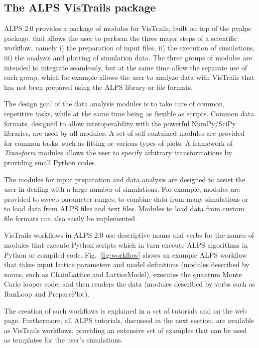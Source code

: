 \documentclass[12pt]{iopart}
\begin{document}
\subsection{The ALPS VisTrails package}

ALPS 2.0 provides a package of modules for VisTrails, built on top of the pyalps package, that allows the user to perform the three major steps of a scientific workflow, namely i) the preparation of input files, ii) the execution of simulations, iii) the analysis and plotting of simulation data. The three groups of modules are intended to integrate seamlessly, but at the same time allow the separate use of each group, which for example allows the user to analyze data with VisTrails that has not been prepared using the ALPS library or file formats.

The design goal of the data analysis modules is to take care of common, repetitive tasks, while at the same time being as flexible as scripts. Common data formats, designed to allow interoperability with the powerful NumPy/SciPy libraries, are used by all modules. A set of self-contained modules are provided for common tasks, such as fitting or various types of plots. A framework of {\it Transform} modules allows the user to specify arbitrary transformations by providing small Python codes.

The modules for input preparation and data analysis are designed to assist the user in dealing with a large number of simulations. For example, modules are provided to sweep parameter ranges, to combine data from many simulations or to load data from ALPS files and text files. Modules to load data from custom file formats can also easily be implemented.

VisTrails workflows in ALPS 2.0 use descriptive nouns and verbs for the names of modules that execute
 Python scripts which in turn execute ALPS
algorithms in Python or compiled code. Fig.~\ref{fig:workflow} shows an example ALPS workflow
that takes input lattice parameters and model definitions (modules described by nouns, such as 
 ChainLattice and LatticeModel), executes the quantum
Monte Carlo looper code, and then renders the data (modules described by verbs such as RunLoop and PreparePlot).

The creation of such workflows is explained in a set of tutorials and on the web page. Furthermore, all ALPS tutorials, discussed in the next section, are available as VisTrails workflows, providing an extensive set of examples that can be used as templates for the user's simulations. 
\end{document}
